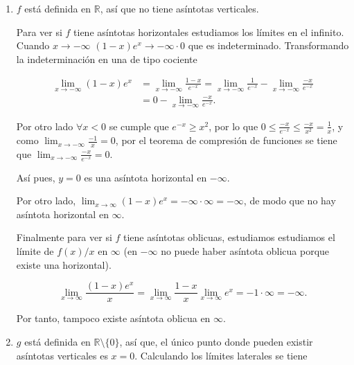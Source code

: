 \documentclass[
  spanish,
  a4paper,
]{scrreport}
\theoremstyle{definition}
\theoremstyle{remark}
\begin{document}
\begin{tcolorbox}[enhanced jigsaw, arc=.35mm, bottomrule=.15mm, bottomtitle=1mm, breakable, colback=white, colbacktitle=quarto-callout-tip-color!10!white, colframe=quarto-callout-tip-color-frame, coltitle=black, left=2mm, leftrule=.75mm, opacityback=0, opacitybacktitle=0.6, rightrule=.15mm, title=\textcolor{quarto-callout-tip-color}{\faLightbulb}\hspace{0.5em}{Solución}, titlerule=0mm, toprule=.15mm, toptitle=1mm]

\begin{enumerate}
\def\labelenumi{\alph{enumi}.}
\item
  \(f\) está definida en \(\mathbb{R}\), así que no tiene asíntotas
  verticales.

  Para ver si \(f\) tiene asíntotas horizontales estudiamos los límites
  en el infinito. Cuando \(x\to -\infty\) \((1-x)e^x\to -\infty\cdot 0\)
  que es indeterminado. Transformando la indeterminación en una de tipo
  cociente

  \begin{align*}
   \lim_{x\to -\infty}(1-x)e^x &= \lim_{x\to -\infty}\frac{1-x}{e^{-x}} = \lim_{x\to -\infty}\frac{1}{e^{-x}}- \lim_{x\to -\infty} \frac{-x}{e^{-x}}\\ 
   &= 0 -\lim_{x\to -\infty}\frac{-x}{e^{-x}}.
   \end{align*}

  Por otro lado \(\forall x<0\) se cumple que \(e^{-x}\geq x^2\), por lo
  que \(0\leq \frac{-x}{e^{-x}}\leq \frac{-x}{x^2}=\frac{1}{x}\), y como
  \(\lim_{x\to -\infty}\frac{-1}{x}=0\), por el teorema de compresión de
  funciones se tiene que \(\lim_{x\to -\infty}\frac{-x}{e^{-x}} = 0\).

  Así pues, \(y=0\) es una asíntota horizontal en \(-\infty\).

  Por otro lado,
  \(\lim_{x\to \infty}(1-x)e^x = -\infty\cdot \infty = -\infty\), de
  modo que no hay asíntota horizontal en \(\infty\).

  Finalmente para ver si \(f\) tiene asíntotas oblicuas, estudiamos
  estudiamos el límite de \(f(x)/x\) en \(\infty\) (en \(-\infty\) no
  puede haber asíntota oblicua porque existe una horizontal).

  \[
   \lim_{x\to \infty}\frac{(1-x)e^x}{x} = \lim_{x\to \infty} \frac{1-x}{x}\lim_{x\to \infty}e^x = -1\cdot \infty = -\infty.
   \]

  Por tanto, tampoco existe asíntota oblicua en \(\infty\).
\item
  \(g\) está definida en \(\mathbb{R}\setminus \{0\}\), así que, el
  único punto donde pueden existir asíntotas verticales es \(x=0\).
  Calculando los límites laterales se tiene


\end{enumerate}
\end{tcolorbox}
\end{document}
